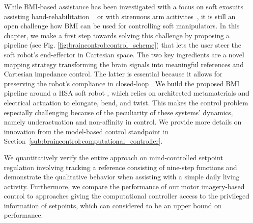 While \gls{BMI}-based assistance has been investigated with a focus on 
soft exosuits assisting hand-rehabilitation ~\cite{zhang2019eeg} or with strenuous arm acitivites~\cite{tacca2022neuro}, 
it is still an open challenge how \gls{BMI} can be used for controlling soft manipulators. 
In this chapter, we make a first step towards solving this challenge by proposing a pipeline (see Fig. \ref{fig:braincontrol:control_scheme}) that lets the user steer the soft robot's end-effector in Cartesian space. The two key ingredients are a novel mapping strategy transforming the brain signals into meaningful references and Cartesian impedance control. The latter is essential because it allows for preserving the robot's compliance in closed-loop \cite{della2017controlling}. We build the proposed \gls{BMI} pipeline around a \gls{HSA} soft robot \cite{stolzle2023modelling, stolzle2024experimental}, %
which relies on architected metamaterials and electrical actuation to elongate, bend, and twist. This makes the control problem especially challenging because of the peculiarity of these systems' dynamics, namely underactuation and non-affinity in control. We provide more details on innovation from the model-based control standpoint in Section~\ref{sub:braincontrol:computational_controller}.
 
We quantitatively verify the entire approach on mind-controlled setpoint regulation involving tracking a reference consisting of nine-step functions and demonstrate the qualitative behavior when assisting with a simple daily living activity. 
Furthermore, we compare the performance of our motor imagery-based control to approaches giving the computational controller access to the privileged information of setpoints, which can considered to be an upper bound on performance.


